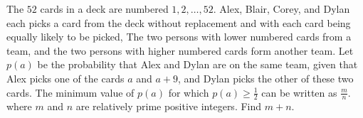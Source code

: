 The $ 52$ cards in a deck are numbered $ 1, 2, \ldots, 52$. Alex, Blair, Corey, and Dylan each picks a card from the deck without replacement and with each card being equally likely to be picked, The two persons with lower numbered cards from a team, and the two persons with higher numbered cards form another team. Let $ p(a)$ be the probability that Alex and Dylan are on the same team, given that Alex picks one of the cards $ a$ and $ a+9$, and Dylan picks the other of these two cards. The minimum value of $ p(a)$ for which $ p(a)\ge\frac12$ can be written as $ \frac{m}{n}$. where $ m$ and $ n$ are relatively prime positive integers. Find $ m+n$.
